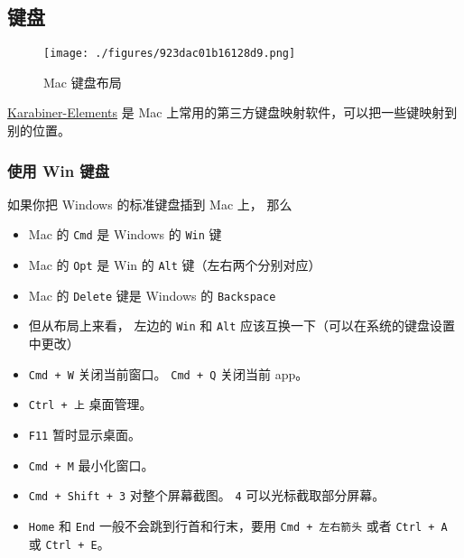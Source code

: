 
\begin{issues}
\issueDraft
\end{issues}

\subsection{键盘}
\begin{figure}[ht]
\centering
\texttt{[image: ./figures/923dac01b16128d9.png]}
\caption{Mac 键盘布局} \label{fig_MacNt_1}
\end{figure}

\href{https://karabiner-elements.pqrs.org/}{Karabiner-Elements} 是 Mac 上常用的第三方键盘映射软件，可以把一些键映射到别的位置。

\subsubsection{使用 Win 键盘}
如果你把 Windows 的标准键盘插到 Mac 上， 那么
\begin{itemize}
\item Mac 的 \verb|Cmd| 是 Windows 的 \verb|Win| 键
\item Mac 的 \verb|Opt| 是 Win 的 \verb|Alt| 键（左右两个分别对应）
\item Mac 的 \verb|Delete| 键是 Windows 的 \verb|Backspace|
\item 但从布局上来看， 左边的 \verb|Win| 和 \verb|Alt| 应该互换一下（可以在系统的键盘设置中更改）
\item \verb|Cmd + W| 关闭当前窗口。 \verb|Cmd + Q| 关闭当前 app。
\item \verb|Ctrl + 上| 桌面管理。
\item \verb|F11| 暂时显示桌面。
\item \verb|Cmd + M| 最小化窗口。
\item \verb|Cmd + Shift + 3| 对整个屏幕截图。 \verb|4| 可以光标截取部分屏幕。
\item \verb|Home| 和 \verb|End| 一般不会跳到行首和行末，要用 \verb|Cmd + 左右箭头| 或者 \verb`Ctrl + A` 或 \verb`Ctrl + E`。
\end{itemize}

